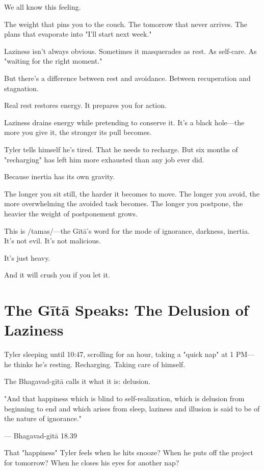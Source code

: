 \documentclass[11pt,twoside]{book}
\begin{document}
We all know this feeling.

The weight that pins you to the couch. The tomorrow that never arrives. The plans that evaporate into "I'll start next week."

Laziness isn't always obvious. Sometimes it masquerades as rest. As self-care. As "waiting for the right moment."

But there's a difference between rest and avoidance. Between recuperation and stagnation.

Real rest restores energy. It prepares you for action.

Laziness drains energy while pretending to conserve it. It's a black hole—the more you give it, the stronger its pull becomes.

Tyler tells himself he's tired. That he needs to recharge. But six months of "recharging" has left him more exhausted than any job ever did.

Because inertia has its own gravity.

The longer you sit still, the harder it becomes to move. The longer you avoid, the more overwhelming the avoided task becomes. The longer you postpone, the heavier the weight of postponement grows.

This is /tamas/—the Gītā's word for the mode of ignorance, darkness, inertia. It's not evil. It's not malicious.

It's just heavy.

And it will crush you if you let it.

\section*{The Gītā Speaks: The Delusion of Laziness}

Tyler sleeping until 10:47, scrolling for an hour, taking a "quick nap" at 1 PM—he thinks he's resting. Recharging. Taking care of himself.

The Bhagavad-gītā calls it what it is: delusion.

\begin{pullquote}
"And that happiness which is blind to self-realization, which is delusion from beginning to end and which arises from sleep, laziness and illusion is said to be of the nature of ignorance."

--- Bhagavad-gītā 18.39
\end{pullquote}

That "happiness" Tyler feels when he hits snooze? When he puts off the project for tomorrow? When he closes his eyes for another nap?
\end{document}
